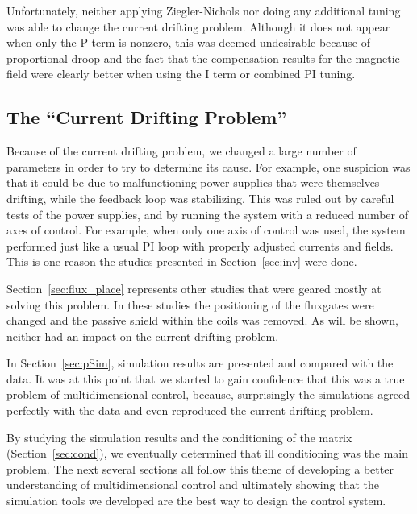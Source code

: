 Unfortunately, neither applying Ziegler-Nichols nor doing any
additional tuning was able to change the current drifting problem.
Although it does not appear when only the P term is nonzero, this was
deemed undesirable because of proportional droop and the fact that the
compensation results for the magnetic field were clearly better when
using the I term or combined PI tuning.

\subsection{The ``Current Drifting Problem''}

Because of the current drifting problem, we changed a large number of
parameters in order to try to determine its cause.  For example, one
suspicion was that it could be due to malfunctioning power supplies
that were themselves drifting, while the feedback loop was
stabilizing.  This was ruled out by careful tests of the power
supplies, and by running the system with a reduced number of axes of
control.  For example, when only one axis of control was used, the
system performed just like a usual PI loop with properly adjusted
currents and fields.  This is one reason the studies presented in
Section~\ref{sec:inv} were done.

Section~\ref{sec:flux_place} represents other studies that were geared
mostly at solving this problem.  In these studies the positioning of
the fluxgates were changed and the passive shield within the coils was
removed.  As will be shown, neither had an impact on the current
drifting problem.

In Section~\ref{sec:pSim}, simulation results are presented and
compared with the data.  It was at this point that we started to gain
confidence that this was a true problem of multidimensional control,
because, surprisingly the simulations agreed perfectly with
the data and even reproduced the current drifting problem.

By studying the simulation results and the conditioning of the
matrix (Section~\ref{sec:cond}), we eventually determined that
ill conditioning was the main problem.  The next several sections all
follow this theme of developing a better understanding of
multidimensional control and ultimately showing that the simulation tools
we developed are the best way to design the control system.


